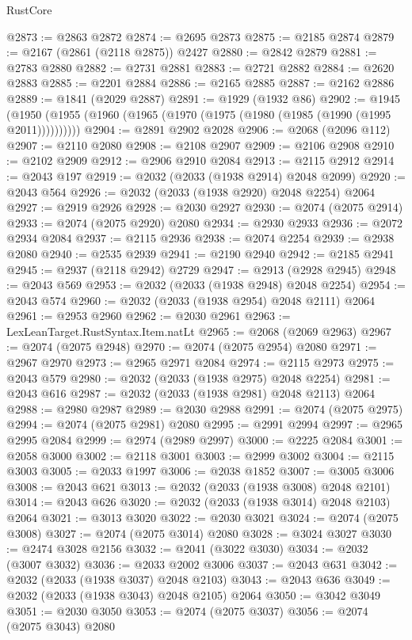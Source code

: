 \begin{lexlean}{RustCore}
\begin{coremodule}
@2873 := @2863 @2872
@2874 := @2695 @2873
@2875 := @2185 @2874
@2879 := @2167 (@2861 (@2118 @2875)) @2427
@2880 := @2842 @2879
@2881 := @2783 @2880
@2882 := @2731 @2881
@2883 := @2721 @2882
@2884 := @2620 @2883
@2885 := @2201 @2884
@2886 := @2165 @2885
@2887 := @2162 @2886
@2889 := @1841 (@2029 @2887)
@2891 := @1929 (@1932 @86)
@2902 := @1945 (@1950 (@1955 (@1960 (@1965 (@1970 (@1975 (@1980 (@1985 (@1990 (@1995 @2011))))))))))
@2904 := @2891 @2902 @2028
@2906 := @2068 (@2096 @112)
@2907 := @2110 @2080
@2908 := @2108 @2907
@2909 := @2106 @2908
@2910 := @2102 @2909
@2912 := @2906 @2910 @2084
@2913 := @2115 @2912
@2914 := @2043 @197
@2919 := @2032 (@2033 (@1938 @2914) @2048 @2099)
@2920 := @2043 @564
@2926 := @2032 (@2033 (@1938 @2920) @2048 @2254) @2064
@2927 := @2919 @2926
@2928 := @2030 @2927
@2930 := @2074 (@2075 @2914)
@2933 := @2074 (@2075 @2920) @2080
@2934 := @2930 @2933
@2936 := @2072 @2934 @2084
@2937 := @2115 @2936
@2938 := @2074 @2254
@2939 := @2938 @2080
@2940 := @2535 @2939
@2941 := @2190 @2940
@2942 := @2185 @2941
@2945 := @2937 (@2118 @2942) @2729
@2947 := @2913 (@2928 @2945)
@2948 := @2043 @569
@2953 := @2032 (@2033 (@1938 @2948) @2048 @2254)
@2954 := @2043 @574
@2960 := @2032 (@2033 (@1938 @2954) @2048 @2111) @2064
@2961 := @2953 @2960
@2962 := @2030 @2961
@2963 := LexLeanTarget.RustSyntax.Item.natLt
@2965 := @2068 (@2069 @2963)
@2967 := @2074 (@2075 @2948)
@2970 := @2074 (@2075 @2954) @2080
@2971 := @2967 @2970
@2973 := @2965 @2971 @2084
@2974 := @2115 @2973
@2975 := @2043 @579
@2980 := @2032 (@2033 (@1938 @2975) @2048 @2254)
@2981 := @2043 @616
@2987 := @2032 (@2033 (@1938 @2981) @2048 @2113) @2064
@2988 := @2980 @2987
@2989 := @2030 @2988
@2991 := @2074 (@2075 @2975)
@2994 := @2074 (@2075 @2981) @2080
@2995 := @2991 @2994
@2997 := @2965 @2995 @2084
@2999 := @2974 (@2989 @2997)
@3000 := @2225 @2084
@3001 := @2058 @3000
@3002 := @2118 @3001
@3003 := @2999 @3002
@3004 := @2115 @3003
@3005 := @2033 @1997
@3006 := @2038 @1852
@3007 := @3005 @3006
@3008 := @2043 @621
@3013 := @2032 (@2033 (@1938 @3008) @2048 @2101)
@3014 := @2043 @626
@3020 := @2032 (@2033 (@1938 @3014) @2048 @2103) @2064
@3021 := @3013 @3020
@3022 := @2030 @3021
@3024 := @2074 (@2075 @3008)
@3027 := @2074 (@2075 @3014) @2080
@3028 := @3024 @3027
@3030 := @2474 @3028 @2156
@3032 := @2041 (@3022 @3030)
@3034 := @2032 (@3007 @3032)
@3036 := @2033 @2002 @3006
@3037 := @2043 @631
@3042 := @2032 (@2033 (@1938 @3037) @2048 @2103)
@3043 := @2043 @636
@3049 := @2032 (@2033 (@1938 @3043) @2048 @2105) @2064
@3050 := @3042 @3049
@3051 := @2030 @3050
@3053 := @2074 (@2075 @3037)
@3056 := @2074 (@2075 @3043) @2080

\end{coremodule}
\end{lexlean}
